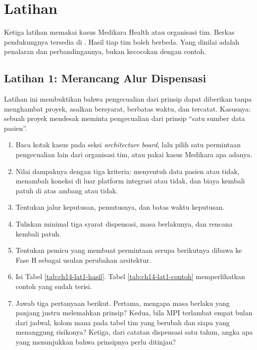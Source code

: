\section{Latihan}

Ketiga latihan memakai kasus Medikara Health atau organisasi tim. Berkas
pendukungnya tersedia di . Hasil tiap tim boleh
berbeda. Yang dinilai adalah penalaran dan perbandingannya, bukan kecocokan
dengan contoh.

\subsection*{Latihan 1: Merancang Alur Dispensasi}

Latihan ini membuktikan bahwa pengecualian dari prinsip dapat diberikan
tanpa menghambat proyek, asalkan bersyarat, berbatas waktu, dan tercatat.
Kasusnya: sebuah proyek mendesak meminta pengecualian dari prinsip ``satu
sumber data pasien''.

\begin{enumerate}
  \item Baca kotak kasus pada seksi \textit{architecture board}, lalu pilih
        satu permintaan pengecualian lain dari organisasi tim, atau pakai
        kasus Medikara apa adanya.
  \item Nilai dampaknya dengan tiga kriteria: menyentuh data pasien atau
        tidak, menambah koneksi di luar platform integrasi atau tidak, dan
        biaya kembali patuh di atas ambang atau tidak.
  \item Tentukan jalur keputusan, pemutusnya, dan batas waktu keputusan.
  \item Tuliskan minimal tiga syarat dispensasi, masa berlakunya, dan
        rencana kembali patuh.
  \item Tentukan pemicu yang membuat permintaan serupa berikutnya dibawa ke
        Fase H sebagai usulan perubahan arsitektur.
  \item Isi Tabel \ref{tab:ch14-lat1-hasil}. Tabel \ref{tab:ch14-lat1-contoh}
        memperlihatkan contoh yang sudah terisi.
  \item Jawab tiga pertanyaan berikut. Pertama, mengapa masa berlaku yang
        panjang justru melemahkan prinsip? Kedua, bila MPI terlambat empat
        bulan dari jadwal, kolom mana pada tabel tim yang berubah dan siapa
        yang menanggung risikonya? Ketiga, dari catatan dispensasi satu
        tahun, angka apa yang menunjukkan bahwa prinsipnya perlu ditinjau?
\end{enumerate}

